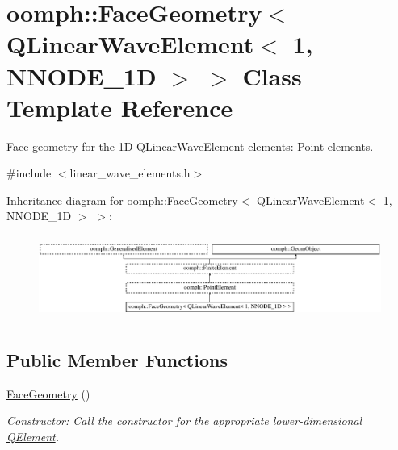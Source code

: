 \hypertarget{classoomph_1_1FaceGeometry_3_01QLinearWaveElement_3_011_00_01NNODE__1D_01_4_01_4}{}\section{oomph\+:\+:Face\+Geometry$<$ Q\+Linear\+Wave\+Element$<$ 1, N\+N\+O\+D\+E\+\_\+1D $>$ $>$ Class Template Reference}
\label{classoomph_1_1FaceGeometry_3_01QLinearWaveElement_3_011_00_01NNODE__1D_01_4_01_4}


Face geometry for the 1D \hyperlink{classoomph_1_1QLinearWaveElement}{Q\+Linear\+Wave\+Element} elements\+: Point elements.  




{\ttfamily \#include $<$linear\+\_\+wave\+\_\+elements.\+h$>$}

Inheritance diagram for oomph\+:\+:Face\+Geometry$<$ Q\+Linear\+Wave\+Element$<$ 1, N\+N\+O\+D\+E\+\_\+1D $>$ $>$\+:\begin{figure}[H]
\begin{center}
\leavevmode
\includegraphics[height=2.800000cm]{classoomph_1_1FaceGeometry_3_01QLinearWaveElement_3_011_00_01NNODE__1D_01_4_01_4}
\end{center}
\end{figure}
\subsection*{Public Member Functions}
\begin{DoxyCompactItemize}
\item 
\hyperlink{classoomph_1_1FaceGeometry_3_01QLinearWaveElement_3_011_00_01NNODE__1D_01_4_01_4_a0fd7955ea3d50a8effb413631d32aec7}{Face\+Geometry} ()
\begin{DoxyCompactList}\small\item\em Constructor\+: Call the constructor for the appropriate lower-\/dimensional \hyperlink{classoomph_1_1QElement}{Q\+Element}. \end{DoxyCompactList}\end{DoxyCompactItemize}
